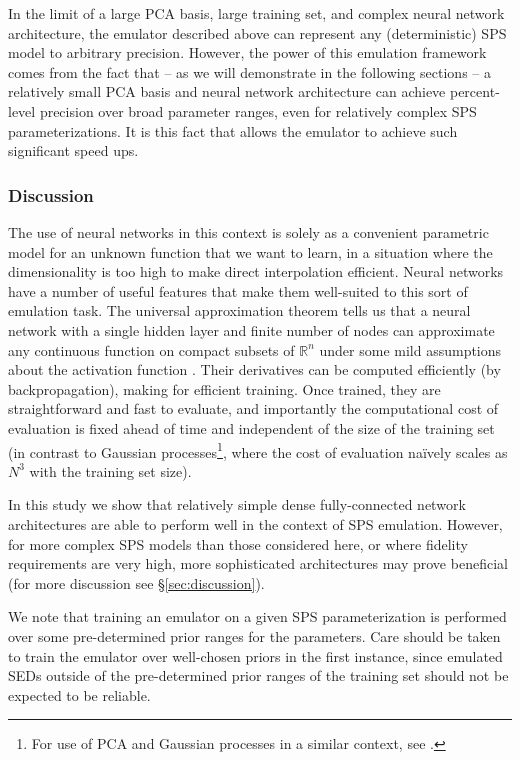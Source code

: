 \documentclass[twocolumn]{aastex62}
\begin{document}
In the limit of a large PCA basis, large training set, and complex neural network architecture, the emulator described above can represent any (deterministic) SPS model to arbitrary precision. However, the power of this emulation framework comes from the fact that -- as we will demonstrate in the following sections -- a relatively small PCA basis and neural network architecture can achieve percent-level precision over broad parameter ranges, even for relatively complex SPS parameterizations. It is this fact that allows the emulator to achieve such significant speed ups.
%
\subsubsection{Discussion}
%
The use of neural networks in this context is solely as a convenient parametric model for an unknown function that we want to learn, in a situation where the dimensionality is too high to make direct interpolation efficient. Neural networks have a number of useful features that make them well-suited to this sort of emulation task. The universal approximation theorem tells us that a neural network with a single hidden layer and finite number of nodes can approximate any continuous function on compact subsets of $\mathbb{R}^n$ under some mild assumptions about the activation function \citep{csaji2001}. Their derivatives can be computed efficiently (by backpropagation), making for efficient training. Once trained, they are straightforward and fast to evaluate, and importantly the computational cost of evaluation is fixed ahead of time and independent of the size of the training set (in contrast to Gaussian processes\footnote{For use of PCA and Gaussian processes in a similar context, see \citet{czekala2015}.}, where the cost of evaluation na\"{i}vely scales as $N^3$ with the training set size).

In this study we show that relatively simple dense fully-connected network architectures are able to perform well in the context of SPS emulation. However, for more complex SPS models than those considered here, or where fidelity requirements are very high, more sophisticated architectures may prove beneficial (for more discussion see \S \ref{sec:discussion}).

We note that training an emulator on a given SPS parameterization is performed over some pre-determined prior ranges for the parameters. Care should be taken to train the emulator over well-chosen priors in the first instance, since emulated SEDs outside of the pre-determined prior ranges of the training set should not be expected to be reliable.
%
\end{document}
